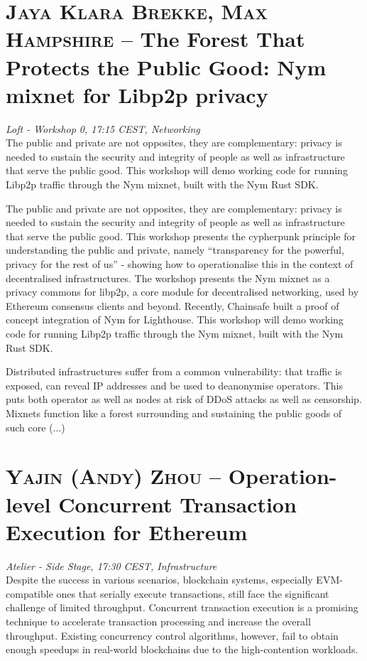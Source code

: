 \section {\textsc{Jaya Klara Brekke, Max Hampshire} -- The Forest That Protects the Public Good: Nym mixnet for Libp2p privacy
} \noindent \textit {Loft - Workshop 0, 17:15 CEST, Networking
}\\[1em] The public and private are not opposites, they are complementary: privacy is needed to sustain the security and integrity of people as well as infrastructure that serve the public good. This workshop will demo working code for running Libp2p traffic through the Nym mixnet, built with the Nym Rust SDK.
\par The public and private are not opposites, they are complementary: privacy is needed to sustain the security and integrity of people as well as infrastructure that serve the public good. This workshop presents the cypherpunk principle for understanding the public and private, namely ``transparency for the powerful, privacy for the rest of us'' - showing how to operationalise this in the context of decentralised infrastructures. The workshop presents the Nym mixnet as a privacy commons for libp2p, a core module for decentralised networking, used by Ethereum consensus clients and beyond. Recently, Chainsafe built a proof of concept integration of Nym for Lighthouse. This workshop will demo working code for running Libp2p traffic through the Nym mixnet, built with the Nym Rust SDK.

Distributed infrastructures suffer from a common vulnerability: that traffic is exposed, can reveal IP addresses and be used to deanonymise operators. This puts both operator as well as nodes at risk of DDoS attacks as well as censorship. Mixnets function like a forest surrounding and sustaining the public goods of such core
(...)\clearpage
\section {\textsc{Yajin (Andy) Zhou} -- Operation-level Concurrent Transaction Execution for Ethereum
} \noindent \textit {Atelier - Side Stage, 17:30 CEST, Infrastructure
}\\[1em] Despite the success in various scenarios, blockchain systems, especially EVM-compatible ones that serially execute transactions, still face the significant challenge of limited throughput. Concurrent transaction execution is a promising technique to accelerate transaction processing and increase the overall throughput. Existing concurrency control algorithms, however, fail to obtain enough speedups in real-world blockchains due to the high-contention workloads.

